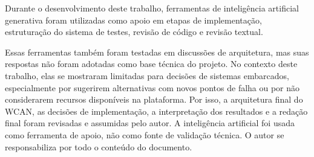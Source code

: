 Durante o desenvolvimento deste trabalho, ferramentas de inteligência artificial generativa foram utilizadas como apoio em etapas de implementação, estruturação do sistema de testes, revisão de código e revisão textual.

Essas ferramentas também foram testadas em discussões de arquitetura, mas suas respostas não foram adotadas como base técnica do projeto. No contexto deste trabalho, elas se mostraram limitadas para decisões de sistemas embarcados, especialmente por sugerirem alternativas com novos pontos de falha ou por não considerarem recursos disponíveis na plataforma. Por isso, a arquitetura final do WCAN, as decisões de implementação, a interpretação dos resultados e a redação final foram revisadas e assumidas pelo autor. A inteligência artificial foi usada como ferramenta de apoio, não como fonte de validação técnica. O autor se responsabiliza por todo o conteúdo do documento.
